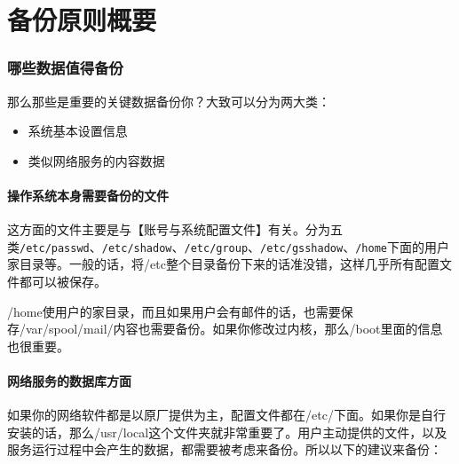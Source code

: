 \documentclass[
]{book}
\providecommand{\tightlist}{%
  \setlength{\itemsep}{0pt}\setlength{\parskip}{0pt}}
\begin{document}
\hypertarget{ux5907ux4efdux539fux5219ux6982ux8981}{%
\chapter{备份原则概要}\label{ux5907ux4efdux539fux5219ux6982ux8981}}

\hypertarget{ux54eaux4e9bux6570ux636eux503cux5f97ux5907ux4efd}{%
\subsection{哪些数据值得备份}\label{ux54eaux4e9bux6570ux636eux503cux5f97ux5907ux4efd}}

那么那些是重要的关键数据备份你？大致可以分为两大类：

\begin{itemize}
\tightlist
\item
  系统基本设置信息
\item
  类似网络服务的内容数据
\end{itemize}

\hypertarget{ux64cdux4f5cux7cfbux7edfux672cux8eabux9700ux8981ux5907ux4efdux7684ux6587ux4ef6}{%
\subsubsection{操作系统本身需要备份的文件}\label{ux64cdux4f5cux7cfbux7edfux672cux8eabux9700ux8981ux5907ux4efdux7684ux6587ux4ef6}}

这方面的文件主要是与【账号与系统配置文件】有关。分为五类\texttt{/etc/passwd}、\texttt{/etc/shadow}、\texttt{/etc/group}、\texttt{/etc/gsshadow}、\texttt{/home}下面的用户家目录等。一般的话，将/etc整个目录备份下来的话准没错，这样几乎所有配置文件都可以被保存。

/home使用户的家目录，而且如果用户会有邮件的话，也需要保存/var/spool/mail/内容也需要备份。如果你修改过内核，那么/boot里面的信息也很重要。

\hypertarget{ux7f51ux7edcux670dux52a1ux7684ux6570ux636eux5e93ux65b9ux9762}{%
\subsubsection{网络服务的数据库方面}\label{ux7f51ux7edcux670dux52a1ux7684ux6570ux636eux5e93ux65b9ux9762}}

如果你的网络软件都是以原厂提供为主，配置文件都在/etc/下面。如果你是自行安装的话，那么/usr/local这个文件夹就非常重要了。用户主动提供的文件，以及服务运行过程中会产生的数据，都需要被考虑来备份。所以以下的建议来备份：
\end{document}
